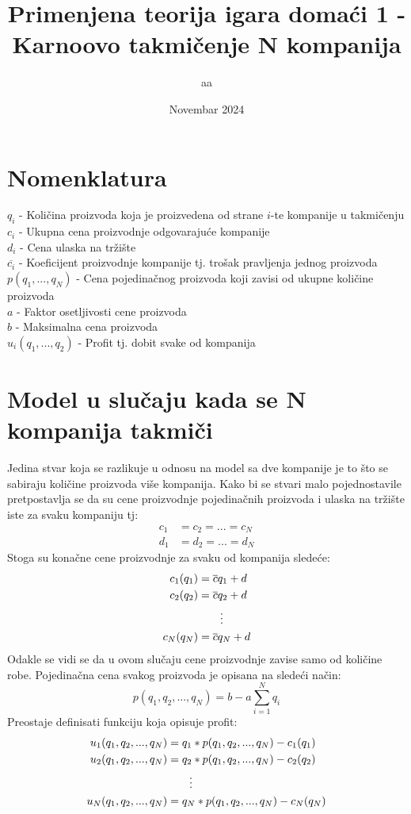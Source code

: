 \documentclass[12pt]{article}
\title{Primenjena teorija igara domaći 1 - Karnoovo takmičenje N kompanija}
\author{aa}
\date{Novembar 2024}
\begin{document}
\maketitle
\section{Nomenklatura}
\noindent
$q_i$ - Količina proizvoda koja je proizvedena od strane $i$-te kompanije u
takmičenju \\[0.2cm]
$c_i$ - Ukupna cena proizvodnje odgovarajuće kompanije \\[0.2cm]
$d_i$ - Cena ulaska na tržište \\[0.2cm]
$\overline{c_i}$ - Koeficijent proizvodnje kompanije tj. trošak pravljenja
jednog proizvoda \\[0.2cm]
$p(q_1,..., q_N)$ - Cena pojedinačnog proizvoda koji zavisi od ukupne količine
proizvoda \\[0.2cm]
$a$ - Faktor osetljivosti cene proizvoda \\[0.2cm]
$b$ - Maksimalna cena proizvoda \\[0.2cm]
$u_i(q_1,..., q_2)$ - Profit tj. dobit svake od kompanija
\section{Model u slučaju kada se N kompanija takmiči}
\par Jedina stvar koja se razlikuje u odnosu na model sa dve kompanije je to
što se sabiraju količine proizvoda više kompanija.
Kako bi se stvari malo pojednostavile pretpostavlja se da su cene proizvodnje
pojedinačnih proizvoda i ulaska na tržište iste za svaku kompaniju tj:
\begin{align*}
	c_1 &= c_2 = ... = c_N \\
	d_1 &= d_2 = ... = d_N 
\end{align*}
Stoga su konačne cene proizvodnje za svaku od kompanija sledeće:
\begin{align*}
	c_1(q_1) &= \overline{c} q_1 + d \\
	c_2(q_2) &= \overline{c} q_2 + d \\
		&\hspace{0.7cm}\vdots \\
	c_N(q_N) &= \overline{c} q_N + d 
\end{align*}
Odakle se vidi se da u ovom slučaju cene proizvodnje zavise samo od količine
robe.
Pojedinačna cena svakog proizvoda je opisana na sledeći način:
\begin{equation}
	p(q_1, q_2, ..., q_N) = b - a \sum_{i=1}^N q_i
\end{equation}
Preostaje definisati funkciju koja opisuje profit:
\begin{align*}
	u_1(q_1, q_2, ..., q_N) &= q_1 * p(q_1, q_2, ..., q_N) - c_1(q_1) \\
	u_2(q_1, q_2, ..., q_N) &= q_2 * p(q_1, q_2, ..., q_N) - c_2(q_2) \\
		&\hspace{0.7cm}\vdots \\
	u_N(q_1, q_2, ..., q_N) &= q_N * p(q_1, q_2, ..., q_N) - c_N(q_N)
\end{align*}
\end{document}
